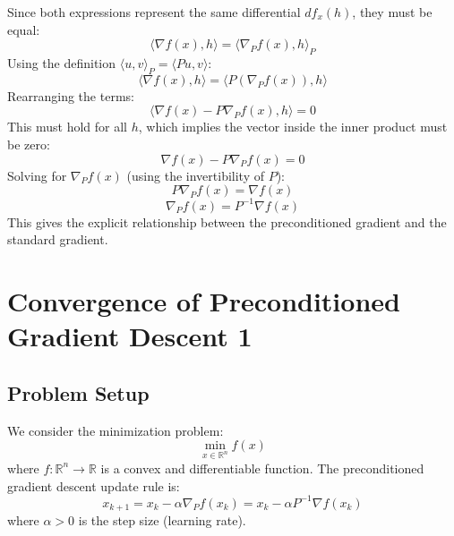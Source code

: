 \documentclass{article}
\newcommand{\R}{\mathbb{R}}
\newcommand{\ip}[2]{\langle #1, #2 \rangle} %
\newcommand{\grad}{\nabla}             %
\newcommand{\gradp}{\nabla_P}
\newcommand{\ipp}[2]{\langle #1, #2 \rangle_P} %
\begin{document}
Since both expressions represent the same differential $df_x(h)$, they must be equal:
\begin{equation*}
    \ip{\grad f(x)}{h} = \ipp{\gradp f(x)}{h}
\end{equation*}
Using the definition $\ipp{u}{v} = \ip{Pu}{v}$:
\begin{equation*}
    \ip{\grad f(x)}{h} = \ip{P (\gradp f(x))}{h}
\end{equation*}
Rearranging the terms:
\begin{equation*}
    \ip{\grad f(x) - P \gradp f(x)}{h} = 0
\end{equation*}
This must hold for all $h$, which implies the vector inside the inner product must be zero:
\begin{equation*}
    \grad f(x) - P \gradp f(x) = 0
\end{equation*}
Solving for $\gradp f(x)$ (using the invertibility of $P$):
\begin{equation*}
    P \gradp f(x) = \grad f(x)
\end{equation*}
\begin{equation} \label{eq:gradp_explicit_app}
    \boxed{\gradp f(x) = P^{-1} \grad f(x)}
\end{equation}
This gives the explicit relationship between the preconditioned gradient and the standard gradient.

\vspace{\baselineskip}

\section*{Convergence of Preconditioned Gradient Descent 1}

\subsection*{Problem Setup}
We consider the minimization problem:
\begin{equation*}
    \min_{x \in \R^n} f(x)
\end{equation*}
where $f: \R^n \to \R$ is a convex and differentiable function.
The preconditioned gradient descent update rule is:
\begin{equation} \label{eq:pgd_update}
    x_{k+1} = x_k - \alpha \gradp f(x_k) = x_k - \alpha P^{-1} \grad f(x_k)
\end{equation}
where $\alpha > 0$ is the step size (learning rate).
\end{document}
